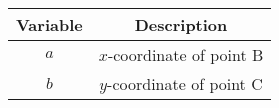 \begin{tabular}[12pt]{ |c| c|}
    \hline
    \textbf{Variable} & \textbf{Description}\\ 
    \hline
    $a$ & $x$-coordinate of point B\\
    \hline 
    $b$ & $y$-coordinate of point C\\
    \hline
    \end{tabular}

